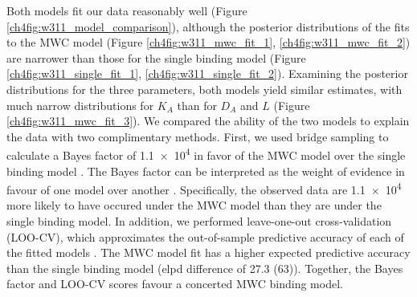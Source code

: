 Both models fit our data reasonably well (Figure \ref{ch4fig:w311_model_comparison}), although the posterior distributions of the fits to the MWC model (Figure \ref{ch4fig:w311_mwc_fit_1}, \ref{ch4fig:w311_mwc_fit_2}) are narrower than those for the single binding model (Figure \ref{ch4fig:w311_single_fit_1}, \ref{ch4fig:w311_single_fit_2}).
Examining the posterior distributions for the three parameters, both models yield similar estimates, with much narrow distributions for $K_A$ than for $D_A$ and $L$ (Figure \ref{ch4fig:w311_mwc_fit_3}).
We compared the ability of the two models to explain the data with two complimentary methods.
First, we used bridge sampling to calculate a Bayes factor of \num{1.1e4} in favor of the MWC model over the single binding model \cite{gronau_bridgesampling_2020}.
The Bayes factor can be interpreted as the weight of evidence in favour of one model over another \cite{wagenmakers_practical_2007}.
Specifically, the observed data are \num{1.1e4} more likely to have occured under the MWC model than they are under the single binding model.
In addition, we performed leave-one-out cross-validation (LOO-CV), which approximates the out-of-sample predictive accuracy of each of the fitted models \cite{vehtari_practical_2017}.
The MWC model fit has a higher expected predictive accuracy than the single binding model (elpd difference of \num{27.3 (63)}).
Together, the Bayes factor and LOO-CV scores favour a concerted MWC binding model.

